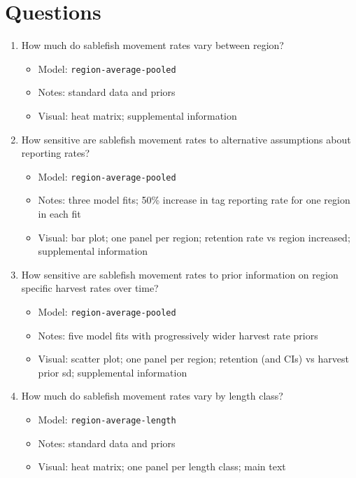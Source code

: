 \documentclass{article}
\begin{document}
\section{Questions}
\begin{enumerate}
    \item How much do sablefish movement rates vary between region?
    \begin{itemize}
        \item Model: \texttt{region-average-pooled}
        \item Notes: standard data and priors
        \item Visual: heat  matrix; supplemental information
    \end{itemize}
    \item How sensitive are sablefish movement rates to alternative assumptions about reporting rates?
    \begin{itemize}
        \item Model: \texttt{region-average-pooled}
        \item Notes: three model fits; 50\% increase in tag reporting rate for one region in each fit
        \item Visual: bar plot; one panel per region; retention rate vs region increased; supplemental information
    \end{itemize}
    \item How sensitive are sablefish movement rates to prior information on region specific harvest rates over time?
    \begin{itemize}
        \item Model: \texttt{region-average-pooled}
        \item Notes: five model fits with progressively wider harvest rate priors
        \item Visual: scatter plot; one panel per region; retention (and CIs) vs harvest prior sd; supplemental information
    \end{itemize}
    \item How much do sablefish movement rates vary by length class?
    \begin{itemize}
        \item Model: \texttt{region-average-length}
        \item Notes: standard data and priors
        \item Visual: heat matrix; one panel per length class; main text
    \end{itemize}

\end{enumerate}
\end{document}
